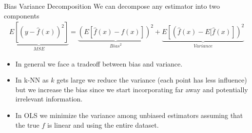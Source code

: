 \begin{frame}{Bias Variance Decomposition}
We can decompose any estimator into two components
\begin{eqnarray*}
\underbrace{E[(y- \hat{f}(x))^2]}_{MSE} =\underbrace{\left( E[\hat{f}(x) - f(x)] \right)^2}_{Bias^2}  +  \underbrace{E \left[ \left(\hat{f}(x) - E[\hat{f}(x) \right] \right)^2}_{Variance} 
\end{eqnarray*}
\begin{itemize}
\item In general we face a tradeoff between bias and variance.
\item In k-NN as $k$ gets large we reduce the variance (each point has less influence) but we increase the bias since we start incorporating far away and potentially irrelevant information.
\item In OLS we minimize the variance among unbiased estimators assuming that the true $f$ is linear and using the entire dataset. 
\end{itemize}
\end{frame}


